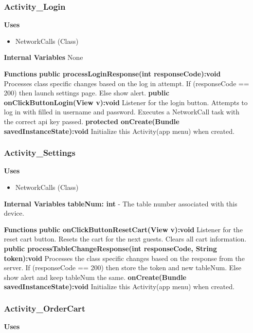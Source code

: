 \documentclass [10pt]{article}
\begin{document}
\subsubsection{Activity\_Login}

\textbf{Uses}

\begin{itemize}
	\item NetworkCalls (Class)
\end{itemize}

\textbf{Internal Variables} None

\textbf{Functions}
\textbf{public processLoginResponse(int responseCode):void}
Processes class specific changes based on the log in attempt. If (responseCode == 200) then launch settings page. Else show alert.
\textbf{public onClickButtonLogin(View v):void}
Listener for the login button. Attempts to log in with filled in username and password. Executes a NetworkCall task with the correct api key passed.
\textbf{protected onCreate(Bundle savedInstanceState):void}
Initialize this Activity(app menu) when created.

\subsubsection{Activity\_Settings}

\textbf{Uses}
\begin{itemize}
	\item NetworkCalls (Class)
\end{itemize}

\textbf{Internal Variables}
\textbf{tableNum: int} - The table number associated with this device.

\textbf{Functions}
\textbf{public onClickButtonResetCart(View v):void}
Listener for the reset cart button. Resets the cart for the next guests. Clears all cart information.
\textbf{public processTableChangeResponse(int responseCode, String token):void}
Processes the class specific changes based on the response from the server. If (responseCode == 200) then store the token and new tableNum. Else show alert and keep tableNum the same.
\textbf{onCreate(Bundle savedInstanceState):void}
Initialize this Activity(app menu) when created.

\subsubsection{Activity\_OrderCart}

\textbf{Uses}
\end{document}

